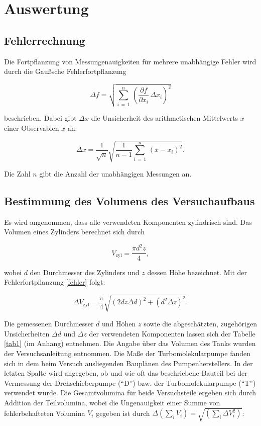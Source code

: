 \section{Auswertung}

\subsection{Fehlerrechnung}

Die Fortpflanzung von Messungenauigkeiten für mehrere unabhängige Fehler wird durch die Gaußsche Fehlerfortpflanzung

\begin{equation}
\Delta f = \sqrt{\sum_{i \, = \, 1}^{n} \, \left(\frac{\partial f}{\partial x_i} \, \Delta x_i\right)^2}
\label{fehler}
\end{equation}

beschrieben. Dabei gibt $\Delta x$ die Unsicherheit des arithmetischen Mittelwerts $\bar{x}$ einer Observablen $x$ an:

\begin{equation}
\Delta x = \frac{1}{\sqrt{n}} \sqrt{\frac{1}{n-1} \sum_{i \, = \, 1}^{n} \, \left(\bar{x}- x_i\right)^2}.
\end{equation}

Die Zahl $n$ gibt die Anzahl der unabhängigen Messungen an.


\subsection{Bestimmung des Volumens des Versuchaufbaus}

Es wird angenommen, dass alle verwendeten Komponenten zylindrisch sind. Das Volumen eines Zylinders berechnet sich durch

\begin{equation}
V_\text{zyl} = \frac{\pi d^2 z}{4},
\end{equation}

wobei $d$ den Durchmesser des Zylinders und $z$ dessen Höhe bezeichnet. Mit der Fehlerfortpflanzung \eqref{fehler} folgt:

\begin{equation}
\Delta V_\text{zyl} = \frac{\pi}{4} \sqrt{(2 d z \Delta d)^2 + (d^2 \Delta z)^2}.
\end{equation}

Die gemessenen Durchmesser $d$ und Höhen $z$ sowie die abgeschätzten, zugehörigen Unsicherheiten $\Delta d$ und $\Delta z$ der verwendeten Komponenten lassen sich der Tabelle \ref{tab1} (im Anhang) entnehmen. Die Angabe über das Volumen des Tanks wurden der Versuchsanleitung \cite{V70} entnommen. Die Maße der Turbomolekularpumpe fanden sich in dem beim Versuch ausliegenden Bauplänen des Pumpenherstellers. In der letzten Spalte wird angegeben, ob und wie oft das beschriebene Bauteil bei der Vermessung der Drehschieberpumpe (\enquote{D}) bzw. der Turbomolekularpumpe (\enquote{T}) verwendet wurde. Die Gesamtvolumina für beide Versuchsteile ergeben sich durch Addition der Teilvolumina, wobei die Ungenauigkeit einer Summe von fehlerbehafteten Volumina $V_i$ gegeben ist durch $\Delta \left(\sum_i V_i\right) = \sqrt{\left(\sum_i \Delta V_i^2 \right)}$:

